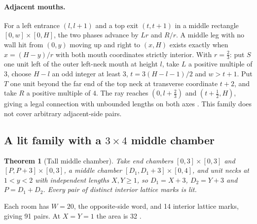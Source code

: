 \documentclass[11pt]{article}
\newtheorem{theorem}{Theorem}
\theoremstyle{definition}
\theoremstyle{remark}
\begin{document}
\paragraph{Adjacent mouths.} For a left entrance $(l,l+1)$ and a top exit
$(t,t+1)$ in a middle rectangle $[0,w]\times[0,H]$, the two phases advance by
$Lr$ and $R/r$. A middle leg with no wall hit from $(0,y)$ moving up and right
to $(x,H)$ exists exactly when $x=(H-y)/r$ with both mouth coordinates strictly
interior. With $r=\tfrac23$: put $S$ one unit left of the outer left-neck mouth
at height $l$, take $L$ a positive multiple of $3$, choose $H-l$ an odd integer
at least $3$, $t=3(H-l-1)/2$ and $w>t+1$. Put $T$ one unit beyond the far end of
the top neck at transverse coordinate $t+2$, and take $R$ a positive multiple of
$4$. The ray reaches $(0,l+\tfrac23)$ and $(t+\tfrac12,H)$, giving a legal
connection with unbounded lengths on both axes \cite{R4,d202}. This family does
not cover arbitrary adjacent-side pairs.

\subsection{A lit family with a \texorpdfstring{$3\times 4$}{3 x 4} middle chamber}
\begin{theorem}[Tall middle chamber]\label{thm:tall}
Take end chambers $[0,3]\times[0,3]$ and $[P,P+3]\times[0,3]$, a middle chamber
$[D_1,D_1+3]\times[0,4]$, and unit necks at $1<y<2$ with independent lengths
$X,Y\ge 1$, so $D_1=X+3$, $D_2=Y+3$ and $P=D_1+D_2$. Every pair of distinct
interior lattice marks is lit.
\end{theorem}

Each room has $W=20$, the opposite-side word, and 14 interior lattice marks,
giving 91 pairs. At $X=Y=1$ the area is 32 \cite{d202}.
\end{document}
